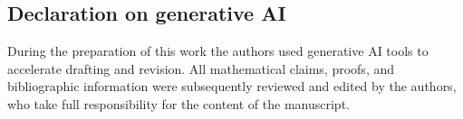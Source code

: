 \documentclass[11pt]{article}
\theoremstyle{plain}
\theoremstyle{definition}
\theoremstyle{remark}
\begin{document}
\subsection*{Declaration on generative AI}
During the preparation of this work the authors used generative AI tools to accelerate drafting and
revision. All mathematical claims, proofs, and bibliographic information were subsequently reviewed
and edited by the authors, who take full responsibility for the content of the manuscript.

\clearpage
\end{document}
